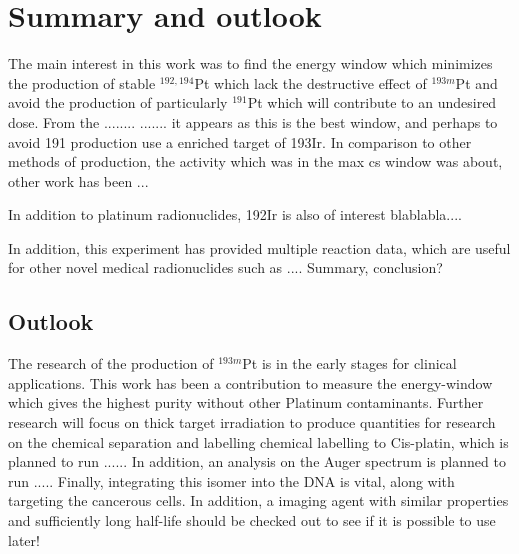 \chapter{Summary and outlook}
The main interest in this work was to find the energy window which minimizes the production of stable $^{192, 194}$Pt which lack the destructive effect of $^{193m}$Pt and avoid the production of particularly $^{191}$Pt which will contribute to an undesired dose. From the ........ .......  it appears as this is the best window, and perhaps to avoid 191 production use a enriched target of 193Ir. In comparison to other methods of production, the activity which was in the max cs window was about, other work has been ... 

In addition to platinum radionuclides, 192Ir is also of interest blablabla.... 



In addition, this experiment has provided multiple reaction data, which are useful for other novel medical radionuclides such as  ....
Summary, conclusion? 

\section{Outlook}
The research of the production of $^{193m}$Pt is in the early stages for clinical applications. This work has been a contribution to measure the energy-window which gives the highest purity without other Platinum contaminants. Further research will focus on thick target irradiation to produce quantities for research on the chemical separation and labelling chemical labelling to Cis-platin, which is planned to run ...... In addition, an analysis on the Auger spectrum is planned to run ..... Finally, integrating this isomer into the DNA is vital, along with targeting the cancerous cells. In addition, a imaging agent with similar properties and sufficiently long half-life should be checked out to see if it is possible to use later! 